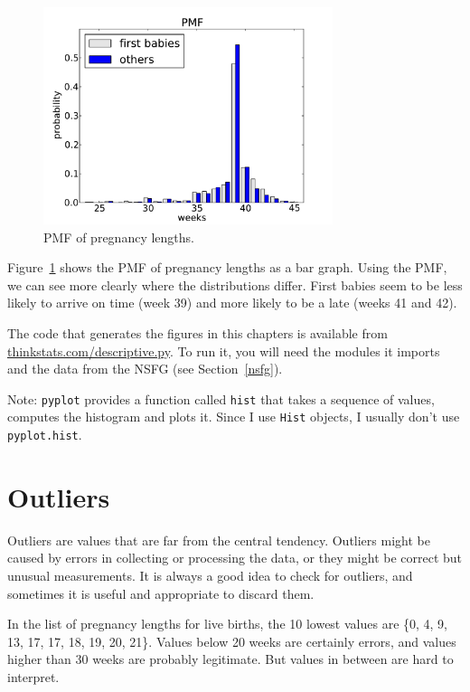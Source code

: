 \documentclass[12pt]{book}
\begin{document}
\begin{figure}
\centerline{\includegraphics[height=2.5in]{figs/nsfg_pmf.pdf}}
\caption{PMF of pregnancy lengths.}
\label{nsfg_pmf}
\end{figure}

Figure~\ref{nsfg_pmf} shows the PMF of pregnancy lengths as a bar
graph.  Using the PMF, we can see more clearly where the distributions
differ.  First babies seem to be less likely to arrive on time (week
39) and more likely to be a late (weeks 41 and 42).

The code that generates the figures in this chapters is available from
\url{thinkstats.com/descriptive.py}.  To run it, you will need the
modules it imports and the data from the NSFG (see
Section~\ref{nsfg}).

Note: {\tt pyplot} provides a function called {\tt hist} that
takes a sequence of values, computes the histogram and plots it.
Since I use {\tt Hist} objects, I usually don't use {\tt pyplot.hist}.


\section{Outliers}

Outliers are values that are far from the central tendency.  Outliers
might be caused by errors in collecting or processing the data, or
they might be correct but unusual measurements.  It is always a good
idea to check for outliers, and sometimes it is useful and appropriate
to discard them.


In the list of pregnancy lengths for live births, the 10 lowest values
are \{0, 4, 9, 13, 17, 17, 18, 19, 20, 21\}.  Values below 20
weeks are certainly errors, and values higher than 30 weeks are
probably legitimate.  But values in between are
hard to interpret.
\end{document}
